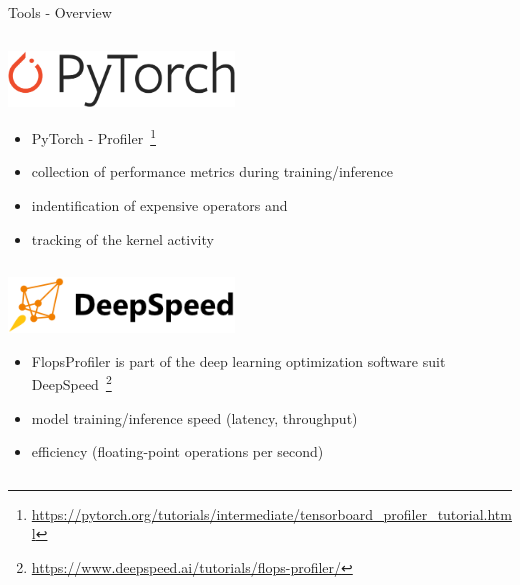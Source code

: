 \documentclass[compress,aspectratio=169]{beamer}
\begin{document}
\begin{frame}{Tools - Overview}
    \begin{column}{0.5\textwidth}
        \begin{block}{\centering \includegraphics[height=4em,keepaspectratio,]{../../data/Pytorch_logo}}

                \begin{itemize}
                    \item PyTorch - Profiler~\footnote{\tiny{\url{https://pytorch.org/tutorials/intermediate/tensorboard_profiler_tutorial.html}}}
                    \item collection of performance metrics during training/inference
                    \item indentification of expensive operators and 
                    \item tracking of the kernel activity
                \end{itemize}
            \end{block}
    \end{column}
    \begin{column}{0.5\textwidth}
        \begin{block}{\centering \includegraphics[height=4em,keepaspectratio,]{../../data/deepspeed-logo-uppercase-bold-white-1.15}}
                
                \begin{itemize}
                    \item FlopsProfiler is part of the deep learning optimization software suit DeepSpeed~\footnote{\tiny{\url{https://www.deepspeed.ai/tutorials/flops-profiler/}}}
                    \item model training/inference speed (latency, throughput)
                    \item efficiency (floating-point operations per second)
                \end{itemize}
            \end{block}
    \end{column}
\end{frame}
\end{document}
